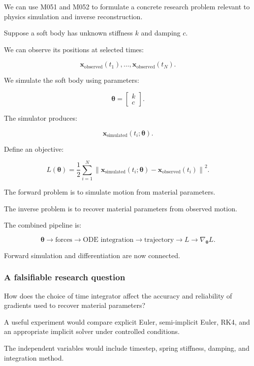 We can use M051 and M052 to formulate a concrete research problem relevant to physics simulation and inverse reconstruction.

Suppose a soft body has unknown stiffness \(k\) and damping \(c\).

We can observe its positions at selected times:

\[
\mathbf x_{\mathrm{observed}}(t_1),\ldots, \mathbf x_{\mathrm{observed}}(t_N).
\]

We simulate the soft body using parameters:

\[
\boldsymbol\theta= \begin{bmatrix} k\\c \end{bmatrix}.
\]

The simulator produces:

\[
\mathbf x_{\mathrm{simulated}}(t_i;\boldsymbol\theta).
\]

Define an objective:

\[
\boxed{ L(\boldsymbol\theta)= \frac12\sum_{i=1}^{N} \left\| \mathbf x_{\mathrm{simulated}}(t_i;\boldsymbol\theta) - \mathbf x_{\mathrm{observed}}(t_i) \right\|^2 }.
\]

The forward problem is to simulate motion from material parameters.

The inverse problem is to recover material parameters from observed motion.

The combined pipeline is:

\[
\boldsymbol\theta \rightarrow \text{forces} \rightarrow \text{ODE integration} \rightarrow \text{trajectory} \rightarrow L \rightarrow \nabla_{\boldsymbol\theta}L.
\]

Forward simulation and differentiation are now connected.

\subsubsection{A falsifiable research question}\label{02-foundations-ii-ch022-a-falsifiable-research-question}

How does the choice of time integrator affect the accuracy and reliability of gradients used to recover material parameters?

A useful experiment would compare explicit Euler, semi-implicit Euler, RK4, and an appropriate implicit solver under controlled conditions.

The independent variables would include timestep, spring stiffness, damping, and integration method.

